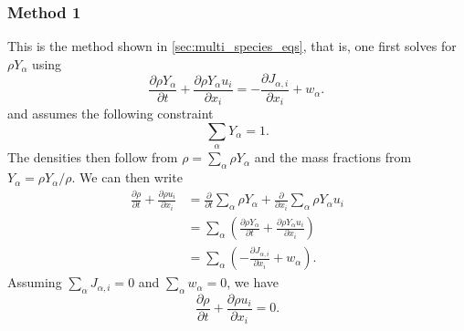 \documentclass[oneside,a4paper,11pt]{report}
\begin{document}
\subsubsection{Method 1}
This is the method shown in \cref{sec:multi_species_eqs}, that is, one first solves for $\rho Y_\alpha$ using
\begin{equation*}
    \frac{\partial\rho Y_\alpha}{\partial t}+\frac{\partial \rho Y_\alpha u_i}{\partial x_i} = -\frac{\partial J_{\alpha,i}}{\partial x_i} + w_\alpha.\,
\end{equation*}
and assumes the following constraint
\begin{equation*}
    \sum_\alpha Y_\alpha = 1.
\end{equation*}
The densities then follow from $\rho = \sum_\alpha \rho Y_\alpha$ and the mass fractions from $Y_\alpha = \rho Y_\alpha / \rho$. We can then write
\begin{align*}
    \frac{\partial \rho}{\partial t} + \frac{\partial \rho u_i}{\partial x_i} &= \frac{\partial}{\partial t} \sum_\alpha \rho Y_\alpha + \frac{\partial}{\partial x_i} \sum_\alpha \rho Y_\alpha u_i \\
    &= \sum_\alpha \left( \frac{\partial \rho Y_\alpha}{\partial t} + \frac{\partial \rho Y_\alpha u_i}{\partial x_i} \right) \\
    &= \sum_\alpha \left( -\frac{\partial J_{\alpha,i}}{\partial x_i} + w_\alpha \right).
\end{align*}
Assuming $\sum_\alpha J_{\alpha,i} = 0$ and $\sum_\alpha w_\alpha = 0$, we have
\begin{equation*}
    \frac{\partial \rho}{\partial t} + \frac{\partial \rho u_i}{\partial x_i} = 0.
\end{equation*}
\end{document}
